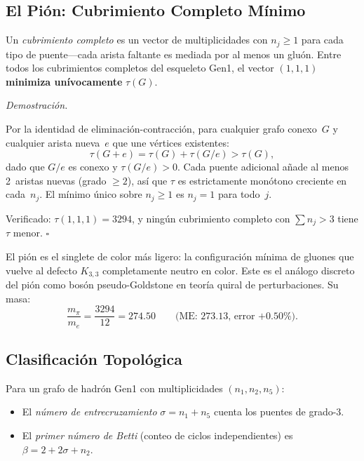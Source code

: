 \documentclass[11pt, a4paper, openany]{book}
\renewenvironment{proof}[1][Demostraci\'on]{%
  \par\noindent\textit{#1.}\quad
}{\hfill$\square$\par\medskip}
\begin{document}
\subsection{El Pi\'on: Cubrimiento Completo M\'inimo}

\begin{theorem}
\label{thm:pion-selection}
Un \emph{cubrimiento completo} es un vector de multiplicidades con
$n_j \geq 1$ para cada tipo de puente---cada arista faltante es
mediada por al menos un glu\'on.  Entre todos los cubrimientos
completos del esqueleto Gen1, el vector $(1, 1, 1)$
\textbf{minimiza un\'ivocamente} $\tau(G)$.
\end{theorem}

\begin{proof}
Por la identidad de eliminaci\'on-contracci\'on, para cualquier
grafo conexo~$G$ y cualquier arista nueva~$e$ que une v\'ertices
existentes:
\[
  \tau(G + e) = \tau(G) + \tau(G/e) > \tau(G),
\]
dado que $G/e$ es conexo y $\tau(G/e) > 0$.  Cada puente adicional
a\~nade al menos 2~aristas nuevas (grado $\geq 2$), as\'i que
$\tau$ es estrictamente mon\'otono creciente en cada~$n_j$.
El m\'inimo \'unico sobre $n_j \geq 1$ es $n_j = 1$ para todo~$j$.

Verificado: $\tau(1, 1, 1) = 3294$, y ning\'un cubrimiento completo
con $\sum n_j > 3$ tiene $\tau$ menor.
\end{proof}

\begin{result}[title={El pi\'on es el objeto confinado m\'as ligero}]
\label{res:pion-lightest}
El pi\'on es el singlete de color m\'as ligero: la configuraci\'on
m\'inima de gluones que vuelve al defecto $K_{3,3}$ completamente
neutro en color.  Este es el an\'alogo discreto del pi\'on como
bos\'on pseudo-Goldstone en teor\'ia quiral de perturbaciones.
Su masa:
\[
  \frac{m_\pi}{m_e} = \frac{3294}{12} = 274{.}50
  \qquad\text{(ME: 273{.}13, error $+0{.}50\%$).}
\]
\end{result}

\subsection{Clasificaci\'on Topol\'ogica}

\begin{definition}
\label{def:topo-invariants}
Para un grafo de hadr\'on Gen1 con multiplicidades $(n_1, n_2, n_5)$:
\begin{itemize}
  \item El \emph{n\'umero de entrecruzamiento}
    $\sigma = n_1 + n_5$ cuenta los puentes de grado-3.
  \item El \emph{primer n\'umero de Betti} (conteo de ciclos
    independientes) es $\beta = 2 + 2\sigma + n_2$.
\end{itemize}
\end{definition}
\end{document}
